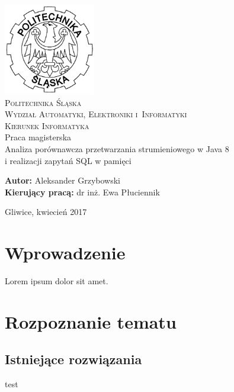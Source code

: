 \documentclass[12pt]{extarticle}
\begin{document}
\begin{titlepage}
    \begin{center}
        \includegraphics[width=4cm]{polsl.png}\\[1cm]
        \textsc{\LARGE{Politechnika Śląska}}\\[0.5cm]
        \textsc{\LARGE{Wydział Automatyki, Elektroniki i~Informatyki}}\\[0.5cm]
        \textsc{\LARGE{Kierunek Informatyka}}\\[2.5cm]
        \LARGE{Praca magisterska}\\[1cm]
        \begingroup
            \fontsize{14pt}{17pt}\selectfont
            Analiza porównawcza przetwarzania strumieniowego w Java 8 \\ i realizacji zapytań SQL w pamięci
        \endgroup
    \end{center}
    \vspace{2cm}
    \begingroup
        \fontsize{14pt}{17pt}\selectfont
        \textbf{Autor:} Aleksander Grzybowski\\
        \textbf{Kierujący pracą:} dr inż. Ewa Płuciennik\\
    \endgroup

    \vspace{1.0cm}
    \begingroup
        \fontsize{12pt}{14pt}\selectfont
        \begin{center}
        Gliwice, kwiecień 2017
        \end{center}
    \endgroup
\end{titlepage}

\clearpage\mbox{}\clearpage

\tableofcontents

\newpage

\section{Wprowadzenie}

Lorem ipsum dolor sit amet.

\section{Rozpoznanie tematu}
\subsection{Istniejące rozwiązania}

test


\clearpage\mbox{}\clearpage
\clearpage\mbox{}\clearpage
\end{document}

